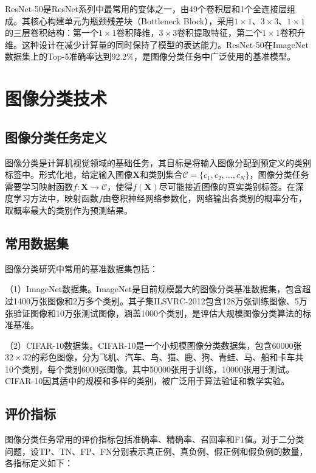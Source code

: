 ResNet-50是ResNet系列中最常用的变体之一，由49个卷积层和1个全连接层组成。其核心构建单元为瓶颈残差块（Bottleneck Block），采用$1 \times 1$、$3 \times 3$、$1 \times 1$的三层卷积结构：第一个$1 \times 1$卷积降维，$3 \times 3$卷积提取特征，第二个$1 \times 1$卷积升维。这种设计在减少计算量的同时保持了模型的表达能力。ResNet-50在ImageNet数据集上的Top-5准确率达到92.2\%，是图像分类任务中广泛使用的基准模型。

\section{图像分类技术}

\subsection{图像分类任务定义}

图像分类是计算机视觉领域的基础任务，其目标是将输入图像分配到预定义的类别标签中。形式化地，给定输入图像$\mathbf{X}$和类别集合$\mathcal{C} = \{c_1, c_2, \ldots, c_N\}$，图像分类任务需要学习映射函数$f: \mathbf{X} \rightarrow \mathcal{C}$，使得$f(\mathbf{X})$尽可能接近图像的真实类别标签。在深度学习方法中，映射函数$f$由卷积神经网络参数化，网络输出各类别的概率分布，取概率最大的类别作为预测结果。

\subsection{常用数据集}

图像分类研究中常用的基准数据集包括：

（1）ImageNet数据集。ImageNet是目前规模最大的图像分类基准数据集，包含超过1400万张图像和2万多个类别\cite{krizhevsky2012imagenet}。其子集ILSVRC-2012包含128万张训练图像、5万张验证图像和10万张测试图像，涵盖1000个类别，是评估大规模图像分类算法的标准基准。

（2）CIFAR-10数据集。CIFAR-10是一个小规模图像分类数据集，包含60000张$32 \times 32$的彩色图像，分为飞机、汽车、鸟、猫、鹿、狗、青蛙、马、船和卡车共10个类别，每个类别6000张图像。其中50000张用于训练，10000张用于测试。CIFAR-10因其适中的规模和多样的类别，被广泛用于算法验证和教学实验。

\subsection{评价指标}

图像分类任务常用的评价指标包括准确率、精确率、召回率和F1值。对于二分类问题，设TP、TN、FP、FN分别表示真正例、真负例、假正例和假负例的数量，各指标定义如下：

